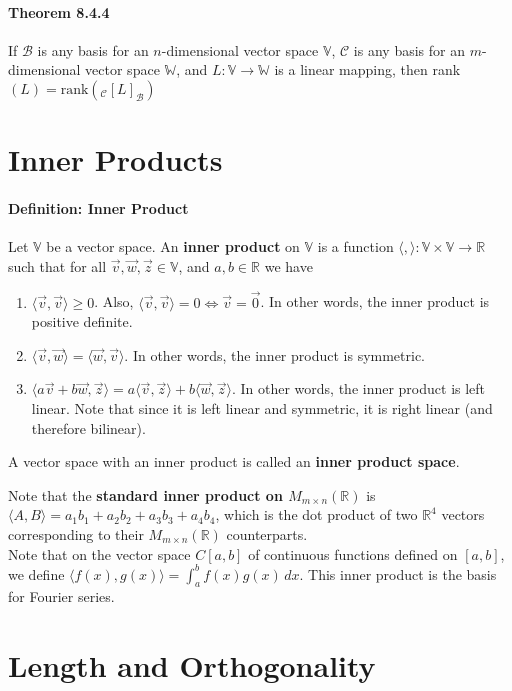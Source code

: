 \documentclass[10pt,letter]{article}
\begin{document}
\paragraph{Theorem 8.4.4} If $\mathcal{B}$ is any basis for an $n$-dimensional vector space $\mathbb{V}$, $\mathcal{C}$ is any basis for an $m$-dimensional vector space $\mathbb{W}$, and $L:\mathbb{V}\rightarrow\mathbb{W}$ is a linear mapping, then rank$(L)=\text{rank}\left(_\mathcal{C}[L]_\mathcal{B}\right)$


\section*{Inner Products}
\paragraph{Definition: Inner Product}
Let $\mathbb{V}$ be a vector space. An \textbf{inner product} on $\mathbb{V}$ is a function $\langle,\rangle:\mathbb{V}\times\mathbb{V}\rightarrow\mathbb{R}$ such that for all $\vec{v},\vec{w},\vec{z}\in\mathbb{V}$, and $a,b\in\mathbb{R}$ we have \begin{enumerate}
    \item $\langle\vec{v},\vec{v}\rangle\geq0$. Also, $\langle\vec{v},\vec{v}\rangle=0\Leftrightarrow\vec{v}=\vec{0}$. In other words, the inner product is positive definite. 
    \item $\langle\vec{v},\vec{w}\rangle=\langle\vec{w},\vec{v}\rangle$. In other words, the inner product is symmetric. 
    \item $\langle a\vec{v}+b\vec{w},\vec{z}\rangle=a\langle\vec{v},\vec{z}\rangle+b\langle\vec{w},\vec{z}\rangle$. In other words, the inner product is left linear. Note that since it is left linear and symmetric, it is right linear (and therefore bilinear). 
\end{enumerate}
A vector space with an inner product is called an \textbf{inner product space}. 

Note that the \textbf{standard inner product on $M_{m\times n}(\mathbb{R})$} is $\langle A,B\rangle=a_1b_1+a_2b_2+a_3b_3+a_4b_4$, which is the dot product of two $\mathbb{R}^4$ vectors corresponding to their $M_{m\times n}(\mathbb{R})$ counterparts. \\ 
Note that on the vector space $C[a,b]$ of continuous functions defined on $[a,b]$, we define $\langle f(x),g(x)\rangle=\int_a^bf(x)g(x)\,dx$. This inner product is the basis for Fourier series.

\section*{Length and Orthogonality} 
\end{document}
